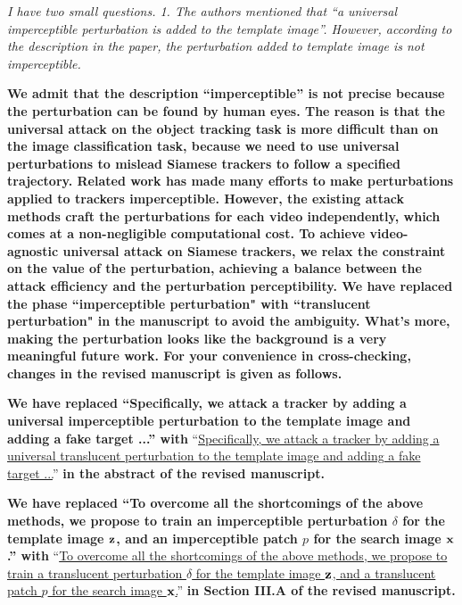\documentclass[12pt]{article}
\begin{document}
\textit{I have two small questions. 1. The authors mentioned that ``a universal imperceptible perturbation is added to the template image''. However, according to the description in the paper, the perturbation added to template image is not imperceptible.}

\textbf{
We admit that the description ``imperceptible'' is not precise because the perturbation can be found by human eyes. The reason is that the universal attack on the object tracking task is more difficult than on the image classification task, because we need to use universal perturbations to mislead Siamese trackers to follow a specified trajectory.
Related work \cite{SPARK, CSA} has made many efforts to make perturbations applied to trackers imperceptible. However, the existing attack methods craft the perturbations for each video independently, which comes at a non-negligible computational cost. To achieve video-agnostic universal attack on Siamese trackers, we relax the constraint on the value of the perturbation, achieving a balance between the attack efficiency and the perturbation perceptibility.
We have replaced the phase ``imperceptible perturbation" with ``translucent perturbation" \cite{zolfi2021translucent} in the manuscript to avoid the ambiguity.
What's more, making the perturbation looks like the background is a very meaningful future work.
For your convenience in cross-checking, changes in the revised manuscript is given as follows.}

\textbf{We have replaced ``Specifically, we attack a tracker by adding a universal imperceptible perturbation to the template image and adding a fake target ...'' with}
 ``\uline{Specifically, we attack a tracker by adding a universal translucent perturbation to the template image and adding a fake target ...}''
\textbf{in the abstract of the revised manuscript.}

\textbf{We have replaced ``To overcome all the shortcomings of the above methods, we propose to train an imperceptible perturbation $\delta$ for the template image $\textbf z$, and an imperceptible patch $p$ for the search image $\textbf x$.'' with} 
``\uline{To overcome all the shortcomings of the above methods, we propose to train a translucent perturbation $\delta$ for the template image $\textbf z$, and a translucent patch $p$ for the search image $\textbf x$.}'' 
\textbf{in Section III.A of the revised manuscript.}
\end{document}

